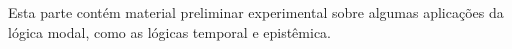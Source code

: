 \documentclass[../../include/open-logic-part]{subfiles}
\begin{document}

\begin{editorial}
Esta parte contém material preliminar experimental sobre algumas
aplicações da lógica modal, como as lógicas temporal e epistêmica.
\end{editorial}



\OLEndPartHook
\end{document}
